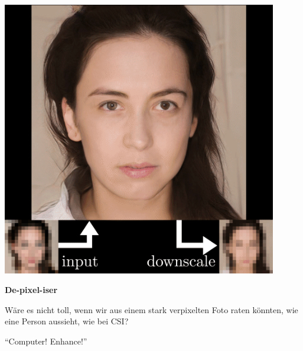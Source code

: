 \documentclass[aspectratio=169,usenames,dvipsnames]{beamer}
\begin{document}
\begin{frame}
\begin{minipage}{.5\textwidth}
\includegraphics[width=0.9\textwidth, keepaspectratio]{images/step6}
\end{minipage}\begin{minipage}{.5\textwidth}
\textbf{De-pixel-iser}
\bigskip

Wäre es nicht toll, wenn wir aus einem stark verpixelten Foto raten könnten, wie eine Person aussieht, wie bei CSI?
\bigskip

``Computer! Enhance!''
\end{minipage}
\end{frame}
\end{document}
